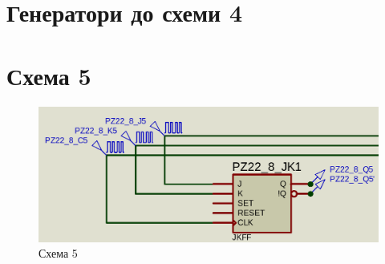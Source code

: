 \documentclass{article}
\begin{document}
\begin{normalsize}
	\section*{Генератори до схеми 4}
	\begin{figure}[H]
		\centering
		\hspace{5px}
	\end{figure}

	\section*{Схема 5}	
	\begin{figure}[H]
		\centering
		\includegraphics[scale=0.25]{s5}	
		\caption{Схема 5}
	\end{figure}
	

\end{normalsize}
\end{document}
